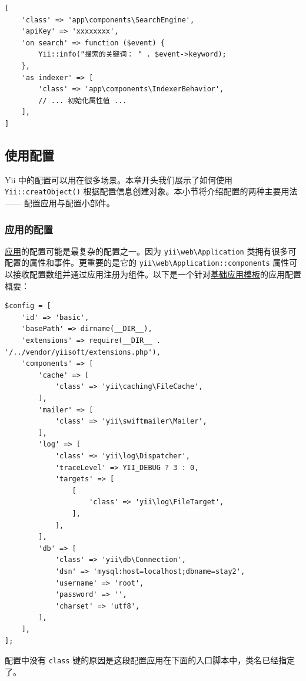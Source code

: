 \lstset{language=php}\begin{lstlisting}
[
    'class' => 'app\components\SearchEngine',
    'apiKey' => 'xxxxxxxx',
    'on search' => function ($event) {
        Yii::info("搜索的关键词： " . $event->keyword);
    },
    'as indexer' => [
        'class' => 'app\components\IndexerBehavior',
        // ... 初始化属性值 ...
    ],
]
\end{lstlisting}
\subsection{使用配置}
Yii 中的配置可以用在很多场景。本章开头我们展示了如何使用 \texttt{Yii\allowbreak{}::\allowbreak{}creatObject()} 根据配置信息创建对象。本小节将介绍配置的两种主要用法 —— 配置应用与配置小部件。

\subsubsection{应用的配置 \label{concept-configurations.md::application-configurations}}
\hyperref[structure-applications.md]{应用}的配置可能是最复杂的配置之一。因为 \texttt{yii{\allowbreak{}\textbackslash}web{\allowbreak{}\textbackslash}Application} 类拥有很多可配置的属性和事件。更重要的是它的 \texttt{yii{\allowbreak{}\textbackslash}web{\allowbreak{}\textbackslash}Application\allowbreak{}::\allowbreak{}components} 属性可以接收配置数组并通过应用注册为组件。以下是一个针对\hyperref[start-basic.md]{基础应用模板}的应用配置概要：

\lstset{language=php}\begin{lstlisting}
$config = [
    'id' => 'basic',
    'basePath' => dirname(__DIR__),
    'extensions' => require(__DIR__ . '/../vendor/yiisoft/extensions.php'),
    'components' => [
        'cache' => [
            'class' => 'yii\caching\FileCache',
        ],
        'mailer' => [
            'class' => 'yii\swiftmailer\Mailer',
        ],
        'log' => [
            'class' => 'yii\log\Dispatcher',
            'traceLevel' => YII_DEBUG ? 3 : 0,
            'targets' => [
                [
                    'class' => 'yii\log\FileTarget',
                ],
            ],
        ],
        'db' => [
            'class' => 'yii\db\Connection',
            'dsn' => 'mysql:host=localhost;dbname=stay2',
            'username' => 'root',
            'password' => '',
            'charset' => 'utf8',
        ],
    ],
];
\end{lstlisting}
配置中没有 \lstinline|class| 键的原因是这段配置应用在下面的入口脚本中，类名已经指定了。

